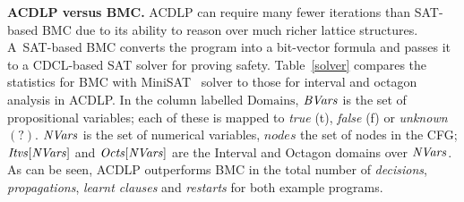 \medskip

\noindent \textbf{ACDLP versus BMC.}
ACDLP can require many fewer iterations than SAT-based BMC due to its
ability to reason over much richer lattice structures.
A~SAT-based BMC converts the program into a bit-vector formula 
and passes it to a CDCL-based SAT solver for proving safety.  
Table~\ref{solver} compares the statistics for BMC with 
MiniSAT~\cite{minisat} solver to those for interval and octagon 
analysis in ACDLP. In the column labelled $\textrm{Domains}$, 
$\mathit{BVars}$ is the set of propositional variables; each of these is mapped to
{\em true} (t), {\em false} (f) or {\em unknown} $(?)$. $\mathit{NVars}$ is the set of
numerical variables, $\mathit{nodes}$ the set of nodes in the CFG;
$\mathit{Itvs}[\mathit{NVars}]$ and $\mathit{Octs}[\mathit{NVars}]$ are the Interval and Octagon
domains over $\mathit{NVars}$. As can be seen, ACDLP outperforms BMC in the total number of 
{\em decisions}, {\em propagations}, {\em learnt clauses} and {\em restarts} 
for both example programs.

